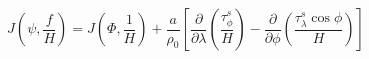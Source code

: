 
\begin{equation}
    J\left(\psi,\frac{f}{H}\right) = J\left(\Phi,\frac{1}{H}\right) + \frac{a}{\rho_0}\left[\frac{\partial}{\partial\lambda}\left(\frac{\tau_\phi^s}{H}\right)-\frac{\partial}{\partial\phi}\left(\frac{\tau_\lambda^s\cos\phi}{H}\right)\right]
\label{EQN:VorticityBalance}
\end{equation}
